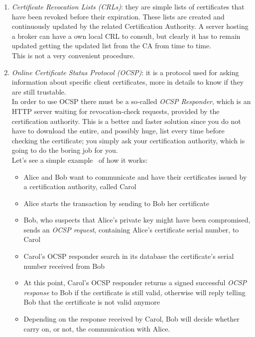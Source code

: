 \documentclass[12pt]{report}
\begin{document}
{{\begin{itemize}
\begin{itemize}
\begin{enumerate}
\item \emph{Certificate Revocation Lists (CRLs)}: they are simple lists of certificates that have been revoked before their expiration.
These lists are created and continuously updated by the related Certification Authority.
A server hosting a broker can have a own local CRL to consult, but clearly it has to remain updated getting the updated list from the CA from time to time.\\
This is not a very convenient procedure.
\item \emph{Online Certificate Status Protocol (OCSP)}:  it is a protocol used for asking information about specific client certificates, more in details to know if they are still trustable.\\
In order to use OCSP there must be a so-called \emph{OCSP Responder}, which is an HTTP server waiting for revocation-check requests, provided by the certification authority.
This is a better and faster solution since you do not have to download the entire, and possibly huge, list every time before checking the certificate; you simply ask your certification authority, which is going to do the boring job for you.\\
Let's see a simple example~\cite{ocspwiki} of how it works:

\begin{itemize}
\item Alice and Bob want to communicate and have their certificates issued by a certification authority, called Carol
\item Alice starts the transaction by sending to Bob her certificate
\item Bob, who suspects that Alice's private key might have been compromised, sends an \emph{OCSP request}, containing Alice's certificate serial number, to Carol
\item Carol's OCSP responder search in its database the certificate's serial number received from Bob
\item At this point, Carol's OCSP responder returns a signed successful \emph{OCSP response} to Bob if the certificate is still valid, otherwise will reply telling Bob that the certificate is not valid anymore
\item Depending on the response received by Carol, Bob will decide whether carry on, or not, the communication with Alice.\\
\end{itemize}



\end{enumerate}
\end{itemize}
\end{itemize}}}
\end{document}
